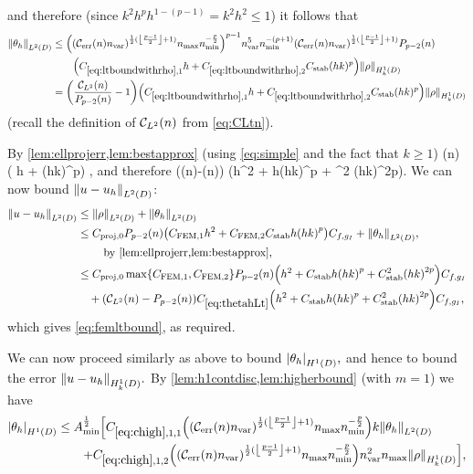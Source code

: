 and therefore (since $k^2h^ph^{1-(p-1)} = k^2h^2 \leq 1$) it follows that
\begin{align}
  \NLtD{\thetah} &\leq \mleft(\mleft(\En\nvar\mright)^{\half(\floor{\frac{p-1}2}+1)}\nmax\nmin^{-\frac{p}2}\mright)^{p-1}\nvar^5 \nmin^{-(p+1)} \mleft(\En\nvar\mright)^{\half(\floor{\frac{p-1}2}+1)} \Pfn{p-2}(n)\nonumber\\
  &\quad\quad\mleft(\CLtboundo h + \CLtboundt  \CAnk (hk)^p\mright)\NHokD{\rho}\label{eq:ltboundwithrho}\\
  &= \mleft(\frac{\CLtn(n)}{\Pfn{p-2}\mleft(n\mright)}-1\mright)\mleft(\CLtboundo h + \CLtboundt  \CAnk (hk)^p\mright)\NHokD{\rho}\label{eq:ltboundwithrho2}
\end{align}
(recall the definition of $\mathcal C_{L^{2}}(n)$ from \cref{eq:CLtn}).

By \cref{lem:ellprojerr,lem:bestapprox} (using \cref{eq:simple} and the fact that $k \geq 1$)
\beq\label{eq:rhoendbound}
\NHokD{\rho} \leq \Crhoendbound  {}\mleft(n\mright) \mleft( h +  \CAnk \mleft(hk\mright)^p\mright) \Cfg,
\eeq
and therefore
\beq\label{eq:thetahLt}
\NLtD{\thetah} \leq \mleft(\CLtn(n)-\mleft(n\mright)\mright) \CthetahLt \mleft(h^2 + \CAnk h\mleft(hk\mright)^p + \CAnk^2 \mleft(hk\mright)^{2p}\mright)\Cfg.
\eeq
We can now bound $\NLtD{u-\uh}$:
\begin{align*}
  \NLtD{u-\uh} &\leq  \NLtD{\rho} + \NLtD{\thetah}\\
  &\leq \Cmmofn{0} \Pfn{p-2}\mleft(n\mright)\mleft(\CFEMo h^2 + \CFEMt \CAnk h\mleft(hk\mright)^{p}\mright)\Cfg + \NLtD{\thetah},\\
  &\quad\quad\text{ by \cref{lem:ellprojerr,lem:bestapprox},}\\
  &\leq \Cmmofn{0} \max\set{\CFEMo,\CFEMt}\Pfn{p-2}\mleft(n\mright)\mleft(h^2 +  \CAnk h\mleft(hk\mright)^{p}+ \CAnk^2\mleft(hk\mright)^{2p}\mright)\Cfg\\
  &\quad+ \mleft(\CLtn(n)-\Pfn{p-2}\mleft(n\mright)\mright) \CthetahLt \mleft(h^2 + \CAnk h\mleft(hk\mright)^p + \CAnk^2 \mleft(hk\mright)^{2p}\mright)\Cfg,
\end{align*}
which gives \cref{eq:femltbound}, as required.

We can now proceed similarly as above to bound $\SNHoD{\thetah},$ and hence to bound the error $\NHokD{u-\uh}.$ By \cref{lem:h1contdisc,lem:higherbound} (with $m=1$) we have %
\begin{align}
\SNHoD{\thetah} &\leq \Amin^{\half} \mleft[\Chighfn{1,1} \mleft(\mleft(\En\nvar\mright)^{\half(\floor{\frac{p-1}2}+1)}\nmax\nmin^{-\frac{p}2}\mright)k \NLtD{\thetah}\mright.\nonumber\\
&\mleft.\quad\quad+ \Chighfn{1,2}\mleft(\mleft(\En\nvar\mright)^{\half(\floor{\frac{p-1}2}+1)}\nmax\nmin^{-\frac{p}2}\mright) \nvar^2\nmax \NHokD{\rho}\mright],\label{eq:sntheta}
\end{align}


